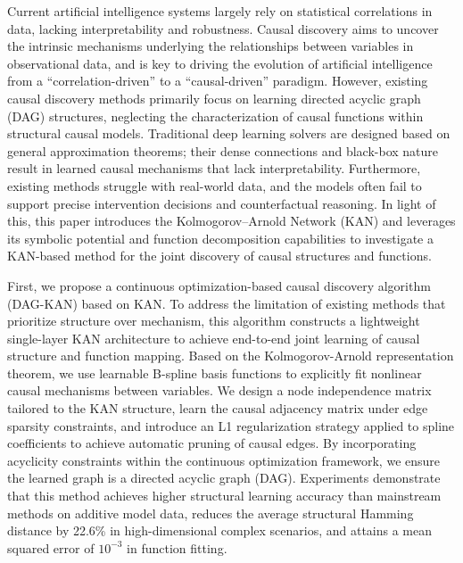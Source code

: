 \begin{eabstract}
Current artificial intelligence systems largely rely on statistical correlations in data, lacking interpretability and robustness. Causal discovery aims to uncover the intrinsic mechanisms underlying the relationships between variables in observational data, and is key to driving the evolution of artificial intelligence from a “correlation-driven” to a “causal-driven” paradigm. However, existing causal discovery methods primarily focus on learning directed acyclic graph (DAG) structures, neglecting the characterization of causal functions within structural causal models. Traditional deep learning solvers are designed based on general approximation theorems; their dense connections and black-box nature result in learned causal mechanisms that lack interpretability. Furthermore, existing methods struggle with real-world data, and the models often fail to support precise intervention decisions and counterfactual reasoning. In light of this, this paper introduces the Kolmogorov–Arnold Network (KAN) and leverages its symbolic potential and function decomposition capabilities to investigate a KAN-based method for the joint discovery of causal structures and functions.

First, we propose a continuous optimization-based causal discovery algorithm (DAG-KAN) based on KAN. To address the limitation of existing methods that prioritize structure over mechanism, this algorithm constructs a lightweight single-layer KAN architecture to achieve end-to-end joint learning of causal structure and function mapping. Based on the Kolmogorov-Arnold representation theorem, we use learnable B-spline basis functions to explicitly fit nonlinear causal mechanisms between variables. We design a node independence matrix tailored to the KAN structure, learn the causal adjacency matrix under edge sparsity constraints, and introduce an L1 regularization strategy applied to spline coefficients to achieve automatic pruning of causal edges. By incorporating acyclicity constraints within the continuous optimization framework, we ensure the learned graph is a directed acyclic graph (DAG). Experiments demonstrate that this method achieves higher structural learning accuracy than mainstream methods on additive model data, reduces the average structural Hamming distance by 22.6\% in high-dimensional complex scenarios, and attains a mean squared error of $10^{-3}$ in function fitting.


\end{eabstract}
